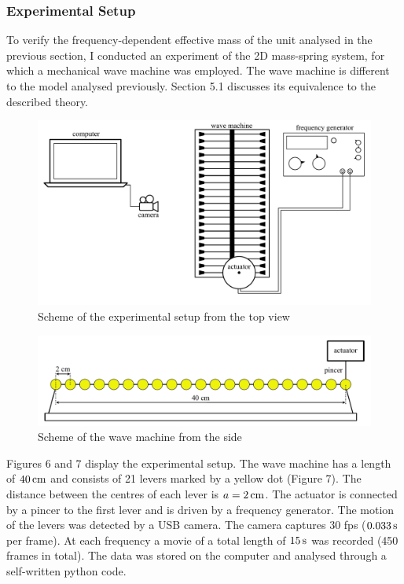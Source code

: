 \documentclass[12pt]{article}
\begin{document}
\subsubsection{Experimental Setup}  \label{sec:section3}
To verify the frequency-dependent effective mass of the unit analysed in the previous section, I conducted an experiment of the 2D mass-spring system, for which a mechanical wave machine was employed. The wave machine is different to the model analysed previously.
	Section 5.1 discusses its equivalence to the described theory.
\begin{figure}[hbt]
  \includegraphics[width=.8\columnwidth]{experimental_setup/experimental_setup_sketch}
  \caption{Scheme of the experimental setup from the top view}
\end{figure}
\begin{figure}[hbt]
  \includegraphics[width=.8\columnwidth]{experimental_setup/experimental_setup_sketch_side}
  \caption{Scheme of the wave machine from the side}
\end{figure}

Figures 6 and 7 display the experimental setup. The wave machine has a length of $40\, {\rm cm}$ and consists of 21 levers marked by a yellow dot (Figure 7). The distance between the centres of each lever is $a=2\, {\rm cm}$. The actuator is connected by a pincer to the first lever and is driven by a frequency generator. The motion of the levers was detected by a USB camera. The camera captures 30 fps ($0.033 \, {\rm s}$ per frame). At each frequency a movie of a total length of $15\,{\rm s}$ was recorded (450 frames in total). The data was stored on the computer and analysed through a self-written python code. 
\end{document}
